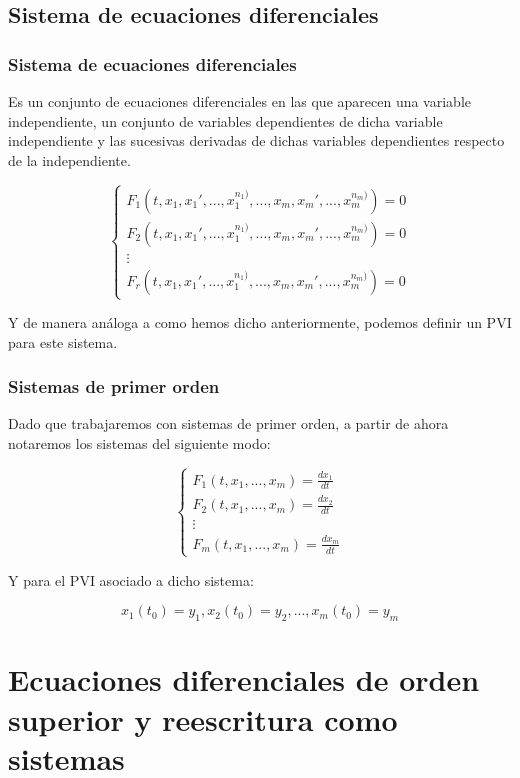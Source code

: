 \documentclass{beamer}
\begin{document}
\subsection{Sistema de ecuaciones diferenciales}
\begin{frame}
	\frametitle{Sistema de ecuaciones diferenciales}
	
	Es un conjunto de ecuaciones diferenciales en las que aparecen una variable independiente, un conjunto de variables dependientes de dicha variable independiente y las sucesivas derivadas de dichas variables dependientes respecto de la independiente. 
	
	$$
	\begin{cases}
	F_1(t, x_1, x_1', ..., x_1^{n_1)}, ..., x_m, x_m', ..., x_m^{n_m)}) = 0 \\
	F_2(t, x_1, x_1', ..., x_1^{n_1)}, ..., x_m, x_m', ..., x_m^{n_m)}) = 0 \\
	\vdots \\
	F_r(t, x_1, x_1', ..., x_1^{n_1)}, ..., x_m, x_m', ..., x_m^{n_m)}) = 0
	\end{cases}
	$$
	
	Y de manera análoga a como hemos dicho anteriormente, podemos definir un PVI para este sistema.
\end{frame}

\begin{frame}
	\frametitle{Sistemas de primer orden}
	Dado que trabajaremos con sistemas de primer orden, a partir de ahora notaremos los sistemas del siguiente modo:
	
	$$
	\begin{cases}
	F_1(t, x_1, ..., x_m) = \frac{d x_1}{d t} \\
	F_2(t, x_1, ..., x_m) = \frac{d x_2}{d t} \\
	\vdots \\
	F_m(t, x_1, ..., x_m) = \frac{d x_m}{d t}
	\end{cases} 
	$$
	
	Y para el PVI asociado a dicho sistema: 
	
	$$ x_1(t_0) = y_1, x_2(t_0) = y_2, ..., x_m(t_0) = y_m $$
\end{frame}

\section{Ecuaciones diferenciales de orden superior y reescritura como sistemas}
\end{document}
